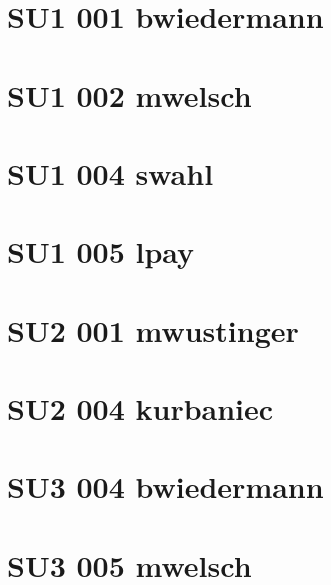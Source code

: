 \documentclass{article}
\begin{document}
\section*{SU1 001 bwiedermann}


\section*{SU1 002 mwelsch}



\section*{SU1 004 swahl}


\section*{SU1 005 lpay}





\section*{SU2 001 mwustinger}




\section*{SU2 004 kurbaniec}






\section*{SU3 004 bwiedermann}


\section*{SU3 005 mwelsch}

\end{document}
